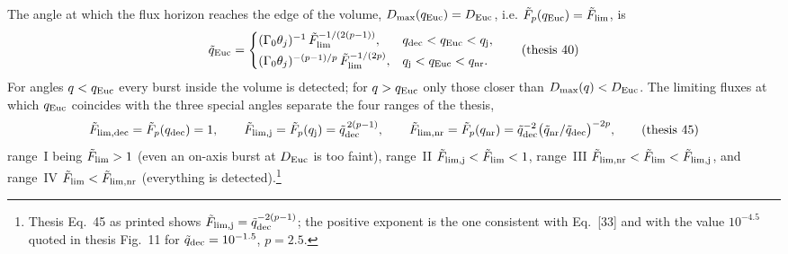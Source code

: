 \documentclass[11pt,a4paper]{article}
\newcommand{\tq}{\tilde{q}}
\newcommand{\tF}{\tilde{F}}
\newcommand{\Euc}{{\rm Euc}}
\newcommand{\dec}{{\rm dec}}
\newcommand{\nr}{{\rm nr}}
\newcommand{\tFlim}{\tilde{F}_{\rm lim}}
\begin{document}
The angle at which the flux horizon reaches the edge of the volume, $D_{\max}(q_\Euc)=D_\Euc$, i.e. $\tF_p(q_\Euc)=\tFlim$, is
\begin{equation}
\tq_\Euc=\begin{cases}(\Gamma_0\theta_j)^{-1}\,\tFlim^{-1/(2(p-1))}, & q_\dec<q_\Euc<q_{\rm j},\\[2pt] (\Gamma_0\theta_j)^{-(p-1)/p}\,\tFlim^{-1/(2p)}, & q_{\rm j}<q_\Euc<q_\nr .\end{cases}
\tag{thesis 40}
\end{equation}
For angles $q<q_\Euc$ every burst inside the volume is detected; for $q>q_\Euc$ only those closer than $D_{\max}(q)<D_\Euc$. The limiting fluxes at which $q_\Euc$ coincides with the three special angles separate the four ranges of the thesis,
\begin{equation}
\label{eq:Flimx}
\tF_{\rm lim,dec}=\tF_p(q_\dec)=1,\qquad
\tF_{\rm lim,j}=\tF_p(q_{\rm j})=\tq_\dec^{\,2(p-1)},\qquad
\tF_{\rm lim,nr}=\tF_p(q_\nr)=\tq_\dec^{-2}\bigl(\tq_\nr/\tq_\dec\bigr)^{-2p},
\tag{thesis 45}
\end{equation}
range~I being $\tFlim>1$ (even an on-axis burst at $D_\Euc$ is too faint), range~II $\tF_{\rm lim,j}<\tFlim<1$, range~III $\tF_{\rm lim,nr}<\tFlim<\tF_{\rm lim,j}$, and range~IV $\tFlim<\tF_{\rm lim,nr}$ (everything is detected).\footnote{Thesis Eq.~45 as printed shows $\tF_{\rm lim,j}=\tq_\dec^{-2(p-1)}$; the positive exponent is the one consistent with Eq.~[33] and with the value $10^{-4.5}$ quoted in thesis Fig.~11 for $\tq_\dec=10^{-1.5}$, $p=2.5$.}
\end{document}
